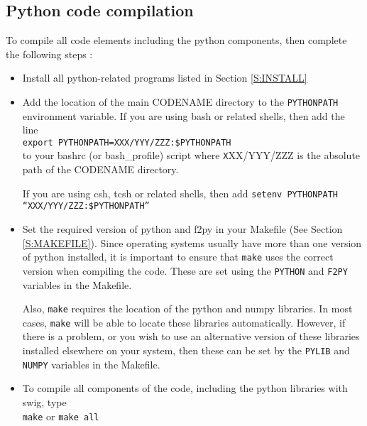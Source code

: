 \documentclass[a4paper]{article}
\newcommand{\var}[1]{\texttt{#1}}
\begin{document}
\subsection{Python code compilation}
To compile all code elements including the python components, then complete the following steps : 
\begin{itemize}

\item Install all python-related programs listed in Section \ref{S:INSTALL}

\item Add the location of the main CODENAME directory to the \var{PYTHONPATH} environment variable.  If you are using bash or related shells, then add the line \\
\newline
\noindent \var{export PYTHONPATH=XXX/YYY/ZZZ:\$PYTHONPATH} \\

\noindent to your bashrc (or bash\_profile) script where {\var XXX/YYY/ZZZ} is the absolute path of the CODENAME directory.  

If you are using csh, tcsh or related shells, then add
\newline
\noindent \var{setenv PYTHONPATH ``XXX/YYY/ZZZ:\$PYTHONPATH''} \\

\item Set the required version of python and f2py in your Makefile (See Section \ref{S:MAKEFILE}).  Since operating systems usually have more than one version of python installed, it is important to ensure that \var{make} uses the correct version when compiling the code.  These are set using the \var{PYTHON} and \var{F2PY} variables in the Makefile.

Also, \var{make} requires the location of the python and numpy libraries.  In most cases, \var{make} will be able to locate these libraries automatically.  However, if there is a problem, or you wish to use an alternative version of these libraries installed elsewhere on your system, then these can be set by the \var{PYLIB} and \var{NUMPY} variables in the Makefile.  


\item To compile all components of the code, including the python libraries with swig, type \\
\newline
\noindent \var{make} or \var{make all} \\

\end{itemize}
\end{document}
